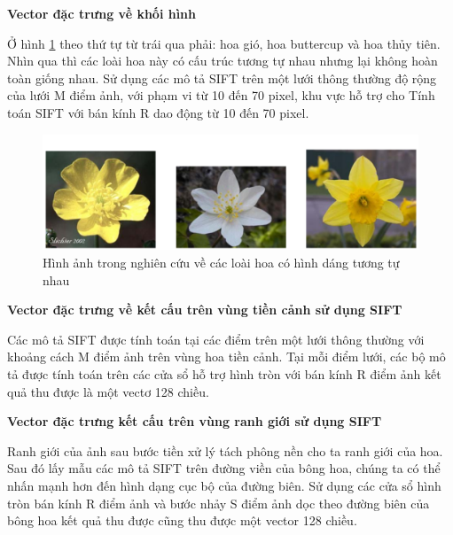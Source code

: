 \documentclass[12pt]{report}
\begin{document}
		\textbf{Vector đặc trưng về khối hình}
																																		
		Ở hình \ref{fig:anh_hoa_hinh_dang} theo thứ tự từ trái qua phải: hoa gió, hoa buttercup và hoa thủy tiên. Nhìn qua thì các loài hoa này có cấu trúc tương tự nhau nhưng lại không hoàn toàn giống nhau. Sử dụng các mô tả SIFT \cite{cia_SIFT} trên một lưới thông thường độ rộng của lưới M điểm ảnh, với phạm vi từ 10 đến 70 pixel, khu vực hỗ trợ cho Tính toán SIFT với bán kính R dao động từ 10 đến 70 pixel.				 
																																											
		\begin{figure}[h]
			\centering
			\includegraphics[scale=0.4]{anh_hoa_hinh_dang}
			\caption{Hình ảnh trong nghiên cứu \cite{cia-Nilsback06} về các loài hoa có hình dáng tương tự nhau}
			\label{fig:anh_hoa_hinh_dang}
		\end{figure}						 
																																														 
																																											
		\textbf{Vector đặc trưng về kết cấu trên vùng tiền cảnh sử dụng SIFT \cite{cia_SIFT}}	
																																		
		Các mô tả SIFT \cite{cia_SIFT} được tính toán tại các điểm trên một lưới thông thường với khoảng cách M điểm ảnh trên vùng hoa tiền cảnh. Tại mỗi điểm lưới, các bộ mô tả được tính toán trên các cửa sổ hỗ trợ hình tròn với bán kính R điểm ảnh kết quả thu được là một vectơ 128 chiều.						 
																																		
																																										 
		\textbf{Vector đặc trưng kết cấu trên vùng ranh giới sử dụng SIFT \cite{cia_SIFT}}												
																																		
		Ranh giới của ảnh sau bước tiền xử lý tách phông nền cho ta ranh giới của hoa. Sau đó lấy mẫu các mô tả SIFT \cite{cia_SIFT} trên đường viền của bông hoa, chúng ta có thể nhấn mạnh hơn đến hình dạng cục bộ của đường biên. Sử dụng các cửa sổ hình tròn bán kính R điểm ảnh và bước nhảy S điểm ảnh dọc theo đường biên của bông hoa kết quả thu được cũng thu được một vector 128 chiều.							
																																												
\end{document}
